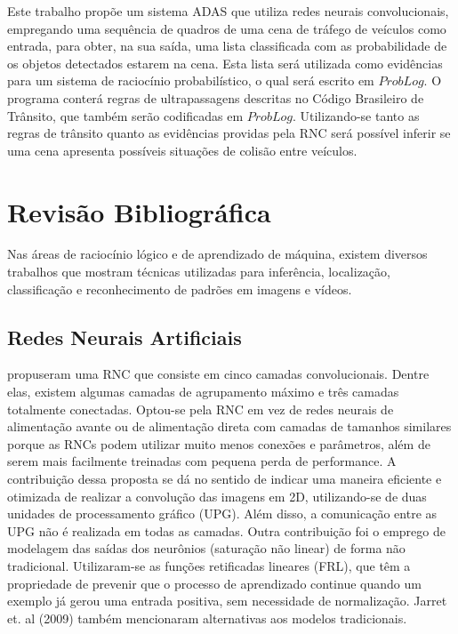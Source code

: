 \documentclass[
	12pt,				%
    oneside,			%
	a4paper,			%
	english,			%
	french,				%
	spanish,			%
	brazil,				%
	]{abntex2}
\begin{document}
Este trabalho propõe um sistema ADAS que utiliza redes neurais convolucionais, empregando uma sequência de quadros de uma cena de tráfego de veículos como entrada, para obter, na sua saída, uma lista classificada com as probabilidade de os objetos detectados estarem na cena. Esta lista será utilizada como evidências para um sistema de raciocínio probabilístico, o qual será escrito em $ProbLog$. O programa conterá regras de ultrapassagens descritas no Código Brasileiro de Trânsito, que também serão codificadas em $ProbLog$. Utilizando-se tanto as regras de trânsito quanto as evidências providas pela RNC será possível inferir se uma cena apresenta possíveis situações de colisão entre veículos.

%

\chapter{Revisão Bibliográfica}

Nas áreas de raciocínio lógico e de aprendizado de máquina, existem diversos trabalhos que mostram técnicas utilizadas para inferência, localização, classificação e reconhecimento de padrões em imagens e vídeos.

\section {Redes Neurais Artificiais}

 propuseram uma RNC que consiste em cinco camadas convolucionais. Dentre elas, existem algumas camadas de agrupamento máximo e três camadas totalmente conectadas. Optou-se pela RNC em vez de redes neurais de alimentação avante ou de alimentação direta com camadas de tamanhos similares porque as RNCs podem utilizar muito menos conexões e parâmetros, além de serem mais facilmente treinadas com pequena perda de performance. A contribuição dessa proposta se dá no sentido de indicar uma maneira eficiente e otimizada de realizar a convolução das imagens em 2D, utilizando-se de duas unidades de processamento gráfico (UPG). Além disso, a comunicação entre as UPG não é realizada em todas as camadas. Outra contribuição foi o emprego de modelagem das saídas dos neurônios (saturação não linear) de forma não tradicional. Utilizaram-se as funções retificadas lineares (FRL), que têm a propriedade de prevenir que o processo de aprendizado continue quando um exemplo já gerou uma entrada positiva, sem necessidade de normalização. Jarret et. al (2009) também mencionaram alternativas aos modelos tradicionais. 
\end{document}
